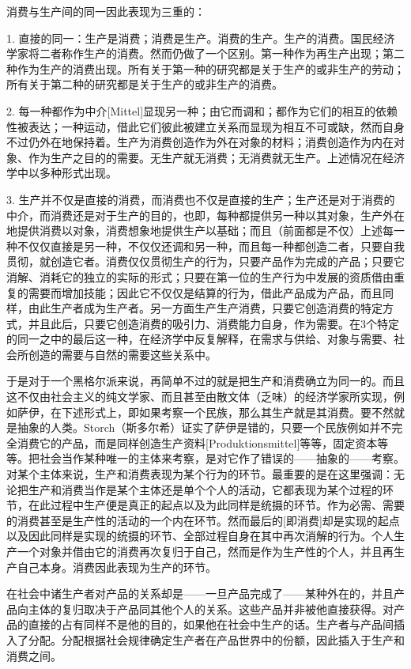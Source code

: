 \documentclass[a4paper,twoside,12pt]{ctexart}
\begin{document}
消费与生产间的同一因此表现为三重的：

1. 直接的同一：生产是消费；消费是生产。消费的生产。生产的消费。国民经济学家将二者称作生产的消费。然而仍做了一个区别。第一种作为再生产出现；第二种作为生产的消费出现。所有关于第一种的研究都是关于生产的或非生产的劳动；所有关于第二种的研究都是关于生产的或非生产的消费。

2. 每一种都作为中介[Mittel]显现另一种；由它而调和；都作为它们的相互的依赖性被表达；一种运动，借此它们彼此被建立关系而显现为相互不可或缺，然而自身不过仍外在地保持着。生产为消费创造作为外在对象的材料；消费创造作为内在对象、作为生产之目的的需要。无生产就无消费；无消费就无生产。上述情况在经济学中以多种形式出现。

3. 生产并不仅是直接的消费，而消费也不仅是直接的生产；生产还是对于消费的中介，而消费还是对于生产的目的，也即，每种都提供另一种以其对象，生产外在地提供消费以对象，消费想象地提供生产以基础；而且（前面都是不仅）上述每一种不仅仅直接是另一种，不仅仅还调和另一种，而且每一种都创造二者，只要自我贯彻，就创造它者。消费仅仅贯彻生产的行为，只要产品作为完成的产品；只要它消解、消耗它的独立的实际的形式；只要在第一位的生产行为中发展的资质借由重复的需要而增加技能；因此它不仅仅是结算的行为，借此产品成为产品，而且同样，由此生产者成为生产者。另一方面生产生产消费，只要它创造消费的特定方式，并且此后，只要它创造消费的吸引力、消费能力自身，作为需要。在3个特定的同一之中的最后这一种，在经济学中反复解释，在需求与供给、对象与需要、社会所创造的需要与自然的需要这些关系中。

于是对于一个黑格尔派来说，再简单不过的就是把生产和消费确立为同一的。而且这不仅由社会主义的纯文学家、而且甚至由散文体（乏味）的经济学家所实现，例如萨伊，在下述形式上，即如果考察一个民族，那么其生产就是其消费。要不然就是抽象的人类。Storch（斯多尔希）证实了萨伊是错的，只要一个民族例如并不完全消费它的产品，而是同样创造生产资料[Produktionsmittel]等等，固定资本等等。把社会当作某种唯一的主体来考察，是对它作了错误的——抽象的——考察。对某个主体来说，生产和消费表现为某个行为的环节。最重要的是在这里强调：无论把生产和消费当作是某个主体还是单个个人的活动，它都表现为某个过程的环节，在此过程中生产便是真正的起点以及为此同样是统摄的环节。作为必需、需要的消费甚至是生产性的活动的一个内在环节。然而最后的[即消费]却是实现的起点以及因此同样是实现的统摄的环节、全部过程自身在其中再次消解的行为。个人生产一个对象并借由它的消费再次复归于自己，然而是作为生产性的个人，并且再生产自己本身。消费因此表现为生产的环节。

在社会中诸生产者对产品的关系却是——一旦产品完成了——某种外在的，并且产品向主体的复归取决于产品同其他个人的关系。这些产品并非被他直接获得。对产品的直接的占有同样不是他的目的，如果他在社会中生产的话。生产者与产品间插入了分配。分配根据社会规律确定生产者在产品世界中的份额，因此插入于生产和消费之间。
\end{document}
